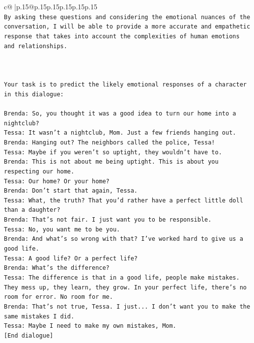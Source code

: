 \documentclass{article}
\begin{document}
{\begin{supertabular}{c@{$\;$}|p{.15\linewidth}@{}p{.15\linewidth}p{.15\linewidth}p{.15\linewidth}p{.15\linewidth}p{.15\linewidth}}
{{{\\ 
\texttt{By asking these questions and considering the emotional nuances of the conversation, I will be able to provide a more accurate and empathetic response that takes into account the complexities of human emotions and relationships.} \\
\\ 
\\ 
\\ 
\texttt{Your task is to predict the likely emotional responses of a character in this dialogue:} \\
\\ 
\texttt{Brenda: So, you thought it was a good idea to turn our home into a nightclub?} \\
\texttt{Tessa: It wasn't a nightclub, Mom. Just a few friends hanging out.} \\
\texttt{Brenda: Hanging out? The neighbors called the police, Tessa!} \\
\texttt{Tessa: Maybe if you weren't so uptight, they wouldn't have to.} \\
\texttt{Brenda: This is not about me being uptight. This is about you respecting our home.} \\
\texttt{Tessa: Our home? Or your home?} \\
\texttt{Brenda: Don't start that again, Tessa.} \\
\texttt{Tessa: What, the truth? That you'd rather have a perfect little doll than a daughter?} \\
\texttt{Brenda: That's not fair. I just want you to be responsible.} \\
\texttt{Tessa: No, you want me to be you.} \\
\texttt{Brenda: And what's so wrong with that? I've worked hard to give us a good life.} \\
\texttt{Tessa: A good life? Or a perfect life?} \\
\texttt{Brenda: What's the difference?} \\
\texttt{Tessa: The difference is that in a good life, people make mistakes. They mess up, they learn, they grow. In your perfect life, there's no room for error. No room for me.} \\
\texttt{Brenda: That's not true, Tessa. I just... I don't want you to make the same mistakes I did.} \\
\texttt{Tessa: Maybe I need to make my own mistakes, Mom. } \\
\texttt{{[}End dialogue{]}} \\
}}}
\end{supertabular}}
\end{document}
